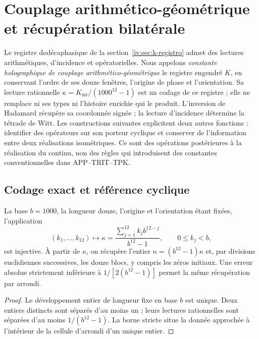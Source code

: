 \section{Couplage arithmético-géométrique et récupération bilatérale}
\label{iv:sec:acoplamiento-recuperacion}

Le registre dodécaphasique de la section~\ref{iv:sec:k-registro} admet
des lectures arithmétiques, d’incidence et opératorielles. Nous appelons
\emph{constante holographique de couplage arithmético-géométrique}
le registre engendré \(K\), en conservant l’ordre de ses douze fenêtres,
l’origine de phase et l’orientation. Sa lecture rationnelle
\(\kappa=K_{\mathrm{int}}/(1000^{12}-1)\) est un codage de ce
registre ; elle ne remplace ni ses types ni l’histoire enrichie qui le produit.
L’inversion de Hadamard récupère sa coordonnée signée ; la lecture
d’incidence détermine la tétrade de Witt. Les constructions suivantes
explicitent deux autres fonctions : identifier des opérateurs sur son porteur
cyclique et conserver de l’information entre deux réalisations isométriques.
Ce sont des opérations postérieures à la réalisation du continu, non des règles
qui introduisent des constantes conventionnelles dans APP--TRIT--TPK.

\subsection{Codage exact et référence cyclique}
\label{iv:subsec:acoplamiento-codigo}

\begin{proposition}
La base \(b=1000\), la longueur douze, l’origine et l’orientation étant fixées, l’application
\[
 (k_1,\ldots,k_{12})\longmapsto
 \kappa=\frac{\sum_{j=1}^{12}k_jb^{12-j}}{b^{12}-1},
 \qquad 0\leq k_j<b,
\]
est injective. À partir de \(\kappa\), on récupère l’entier
\(n=(b^{12}-1)\kappa\) et, par divisions euclidiennes successives, les douze
blocs, y compris les zéros initiaux. Une erreur absolue strictement
inférieure à \(1/[2(b^{12}-1)]\) permet la même récupération par arrondi.
\end{proposition}
\begin{proof}
Le développement entier de longueur fixe en base \(b\) est unique. Deux entiers
distincts sont séparés d’au moins un ; leurs lectures rationnelles
sont séparées d’au moins \(1/(b^{12}-1)\). La borne stricte situe la
donnée approchée à l’intérieur de la cellule d’arrondi d’un unique entier.
\end{proof}

